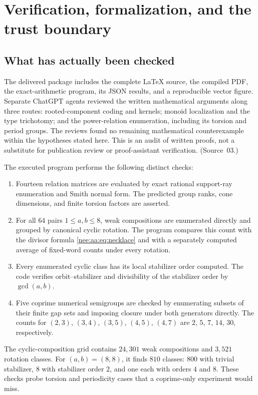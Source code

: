 \documentclass[11pt,letterpaper]{article}
\numberwithin{equation}{section}
\theoremstyle{plain}
\theoremstyle{definition}
\theoremstyle{remark}
\begin{document}
\section{Verification, formalization, and the trust boundary}\label{nee:aa:sec:verification}
\label{nee:ci:sec:verification}

\subsection{What has actually been checked}

The delivered package includes the complete LaTeX source, the compiled PDF,
the exact-arithmetic program, its JSON results, and a reproducible vector
figure. Separate ChatGPT agents reviewed the written mathematical arguments
along three routes: rooted-component coding and kernels; monoid localization and
the type trichotomy; and the power-relation enumeration, including its torsion
and period groups. The reviews found no remaining mathematical counterexample
within the hypotheses stated here. This is an audit of written proofs, not a
substitute for publication review or proof-assistant verification. (Source~03.)

The executed program performs the following distinct checks:
\begin{enumerate}
\item Fourteen relation matrices are evaluated by exact rational support-ray
enumeration and Smith normal form. The predicted group ranks, cone dimensions,
and finite torsion factors are asserted.
\item For all $64$ pairs $1\leq a,b\leq8$, weak compositions are enumerated
directly and grouped by canonical cyclic rotation. The program compares this
count with the divisor formula \eqref{nee:aa:eq:necklace} and with a separately
computed average of fixed-word counts under every rotation.
\item Every enumerated cyclic class has its local stabilizer order computed.
The code verifies orbit--stabilizer and divisibility of the stabilizer order
by $\gcd(a,b)$.
\item Five coprime numerical semigroups are checked by enumerating subsets
of their finite gap sets and imposing closure under both generators directly.
The counts for $(2,3)$, $(3,4)$, $(3,5)$, $(4,5)$, $(4,7)$ are
$2$, $5$, $7$, $14$, $30$, respectively.
\end{enumerate}
The cyclic-composition grid contains $24{,}301$ weak compositions and
$3{,}521$ rotation classes. For $(a,b)=(8,8)$, it finds $810$ classes:
$800$ with trivial stabilizer, $8$ with stabilizer order $2$, and one each
with orders $4$ and $8$. These checks probe torsion and periodicity cases
that a coprime-only experiment would miss.
\end{document}
